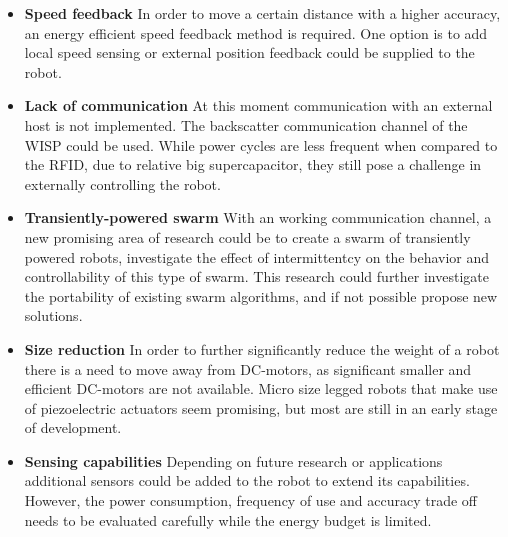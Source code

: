 \begin{itemize}

\item \textbf{Speed feedback} 
In order to move a certain distance with a higher accuracy, an energy efficient speed feedback method is required.
One option is to add local speed sensing or external position feedback could be supplied to the robot.


\item \textbf{Lack of communication}
At this moment communication with an external host is not implemented.
The backscatter communication channel of the WISP could be used.
While power cycles are less frequent when compared to the RFID, due to relative big supercapacitor, they still pose a challenge in externally controlling the robot.

\item \textbf{Transiently-powered swarm}
With an working communication channel, a new promising area of research could be to create a swarm of transiently powered robots, investigate the effect of intermittentcy on the behavior and controllability of this type of swarm.
This research could further investigate the portability of existing swarm algorithms, and if not possible propose new solutions.	

\item \textbf{Size reduction} 
In order to further significantly reduce the weight of a robot there is a need to move away from DC-motors, as significant smaller and efficient DC-motors are not available.
Micro size legged robots that make use of piezoelectric actuators seem promising, but most are still in an early stage of development.

\item \textbf{Sensing capabilities}
Depending on future research or applications additional sensors could be added to the robot to extend its capabilities.
However, the power consumption, frequency of use and accuracy trade off needs to be evaluated carefully while the energy budget is limited.


\end{itemize}

